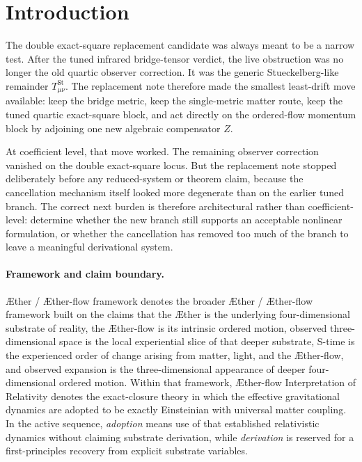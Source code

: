 \documentclass[11pt]{article}
\newcommand{\Aether}{\AE{}ther}
\newcommand{\Aflow}{\AE{}ther-flow}
\newcommand{\TheoryName}{\Aflow{} Interpretation of Relativity}
\newcommand{\TheoryProgram}{\Aether{} / \Aflow{} framework}
\begin{document}
\begin{abstract}
The double exact-square replacement candidate is thus not a viable nonlinear branch at current scope. Its failure is not that the generic observer remainder survives; that part was removed. Its failure is architectural: exact-squaring the remaining momentum block annihilates the ordered-flow equation itself and destroys full-branch local uniqueness and slice closure. The correct next step after this note is not reduced-system or theorem work on this branch, but a broader redesign that removes \(T_{\mu\nu}^{\mathrm{St}}\) without eliminating the ordered-flow dynamics altogether, unless a new symmetry or quotient principle is introduced explicitly.
\end{abstract}

\section{Introduction}

The double exact-square replacement candidate was always meant to be a narrow test. After the tuned infrared bridge-tensor verdict, the live obstruction was no longer the old quartic observer correction. It was the generic Stueckelberg-like remainder \(T_{\mu\nu}^{\mathrm{St}}\). The replacement note therefore made the smallest least-drift move available: keep the bridge metric, keep the single-metric matter route, keep the tuned quartic exact-square block, and act directly on the ordered-flow momentum block by adjoining one new algebraic compensator \(Z\).

At coefficient level, that move worked. The remaining observer correction vanished on the double exact-square locus. But the replacement note stopped deliberately before any reduced-system or theorem claim, because the cancellation mechanism itself looked more degenerate than on the earlier tuned branch. The correct next burden is therefore architectural rather than coefficient-level: determine whether the new branch still supports an acceptable nonlinear formulation, or whether the cancellation has removed too much of the branch to leave a meaningful derivational system.

\paragraph{Framework and claim boundary.}
\TheoryProgram{} denotes the broader \Aether{} / \Aflow{} framework built on the claims that the \Aether{} is the underlying four-dimensional substrate of reality, the \Aflow{} is its intrinsic ordered motion, observed three-dimensional space is the local experiential slice of that deeper substrate, S-time is the experienced order of change arising from matter, light, and the \Aflow{}, and observed expansion is the three-dimensional appearance of deeper four-dimensional ordered motion. Within that framework, \TheoryName{} denotes the exact-closure theory in which the effective gravitational dynamics are adopted to be exactly Einsteinian with universal matter coupling. In the active sequence, \emph{adoption} means use of that established relativistic dynamics without claiming substrate derivation, while \emph{derivation} is reserved for a first-principles recovery from explicit substrate variables.
\end{document}
